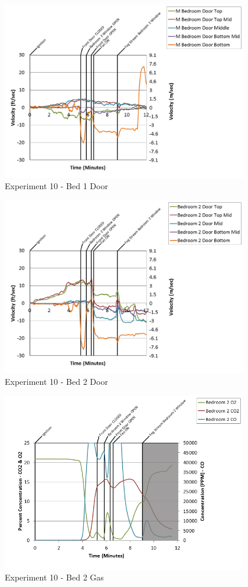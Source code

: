 \documentclass{article}
\begin{document}
\begin{appendices}
\clearpage

\begin{figure}[h!]
	\centering
	\includegraphics[height=3.05in]{0_Images/Results_Charts/Exp_10_Charts/Bed1Door.png}
	\caption{Experiment 10 - Bed 1 Door}
\end{figure}


\begin{figure}[h!]
	\centering
	\includegraphics[height=3.05in]{0_Images/Results_Charts/Exp_10_Charts/Bed2Door.png}
	\caption{Experiment 10 - Bed 2 Door}
\end{figure}

\clearpage

\begin{figure}[h!]
	\centering
	\includegraphics[height=3.05in]{0_Images/Results_Charts/Exp_10_Charts/Bed2Gas.png}
	\caption{Experiment 10 - Bed 2 Gas}
\end{figure}



\end{appendices}
\end{document}
